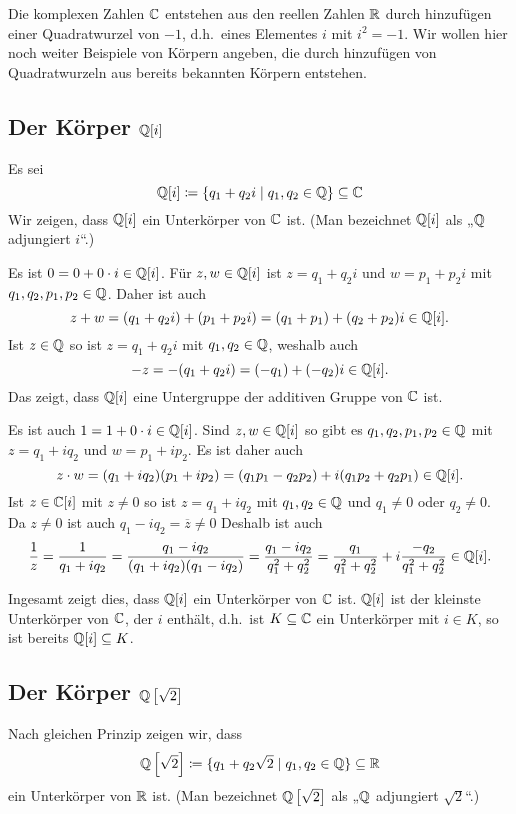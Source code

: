 Die komplexen Zahlen $\mathbb{C}$ entstehen aus den reellen Zahlen $\mathbb{R}$ durch hinzufügen einer Quadratwurzel von $-1$, d.h.\ eines Elementes $i$ mit $i^2 = -1$. Wir wollen hier noch weiter Beispiele von Körpern angeben, die durch hinzufügen von Quadratwurzeln aus bereits bekannten Körpern entstehen.



\subsection{Der Körper \texorpdfstring{$\mathbb{Q}[i]$}{Q[i]}}\label{ssec: Q[i]}
Es sei
\[
 \mathbb{Q}[i]
 \coloneqq
 \{ q_1 + q_2 i \mid q_1, q_2 \in \mathbb{Q} \}
 \subseteq \mathbb{C}
\]
Wir zeigen, dass $\mathbb{Q}[i]$ ein Unterkörper von $\mathbb{C}$ ist. (Man bezeichnet $\mathbb{Q}[i]$ als „$\mathbb{Q}$ adjungiert $i$“.)

Es ist $0 = 0 + 0 \cdot i \in \mathbb{Q}[i]$. Für $z,w \in \mathbb{Q}[i]$ ist $z = q_1 + q_2 i$ und $w = p_1 + p_2 i$ mit $q_1, q_2, p_1, p_2 \in \mathbb{Q}$. Daher ist auch
\[
 z + w
 = (q_1 + q_2 i) + (p_1 + p_2 i)
 = (q_1 + p_1) + (q_2 + p_2) i
 \in \mathbb{Q}[i].
\]
Ist $z \in \mathbb{Q}$ so ist $z = q_1 + q_2 i$ mit $q_1, q_2 \in \mathbb{Q}$, weshalb auch
\[
 -z = -(q_1 + q_2 i) = (-q_1) + (-q_2) i \in \mathbb{Q}[i].
\]
Das zeigt, dass $\mathbb{Q}[i]$ eine Untergruppe der additiven Gruppe von $\mathbb{C}$ ist.

Es ist auch $1 = 1 + 0 \cdot i \in \mathbb{Q}[i]$. Sind $z, w \in \mathbb{Q}[i]$ so gibt es $q_1, q_2, p_1, p_2 \in \mathbb{Q}$ mit $z = q_1 + i q_2$ und $w = p_1 + i p_2$. Es ist daher auch
\[
 z \cdot w
 = (q_1 + iq_2)(p_1 + ip_2)
 = (q_1 p_1 - q_2 p_2) + i(q_1 p_2 + q_2 p_1)
 \in \mathbb{Q}[i].
\]
Ist $z \in \mathbb{C}[i]$ mit $z \neq 0$ so ist $z = q_1 + i q_2$ mit $q_1, q_2 \in \mathbb{Q}$ und $q_1 \neq 0$ oder $q_2 \neq 0$. Da $z \neq 0$ ist auch $q_1 - i q_2 = \overline{z} \neq 0$ Deshalb ist auch
\[
 \frac{1}{z}
 = \frac{1}{q_1 + i q_2}
 = \frac{q_1 - i q_2}{(q_1 + i q_2)(q_1 - i q_2)}
 = \frac{q_1 - i q_2}{q_1^2 + q_2^2}
 = \frac{q_1}{q_1^2 + q_2^2} + i \frac{-q_2}{q_1^2+q_2^2}
 \in \mathbb{Q}[i].
\]

Ingesamt zeigt dies, dass $\mathbb{Q}[i]$ ein Unterkörper von $\mathbb{C}$ ist. $\mathbb{Q}[i]$ ist der kleinste Unterkörper von $\mathbb{C}$, der $i$ enthält, d.h.\ ist $K \subseteq \mathbb{C}$ ein Unterkörper mit $i \in K$, so ist bereits $\mathbb{Q}[i] \subseteq K$.



\subsection{Der Körper \texorpdfstring{$\mathbb{Q}\left[\sqrt{2}\right]$}{Q[sqrt(2)]}}
Nach gleichen Prinzip zeigen wir, dass
\[
 \mathbb{Q}\left[\sqrt{2}\right] \coloneqq \{ q_1 + q_2 \sqrt{2} \mid q_1, q_2 \in \mathbb{Q} \} \subseteq \mathbb{R}
\]
ein Unterkörper von $\mathbb{R}$ ist. (Man bezeichnet $\mathbb{Q}\left[\sqrt{2}\right]$ als „$\mathbb{Q}$ adjungiert $\sqrt{2}$“.)

